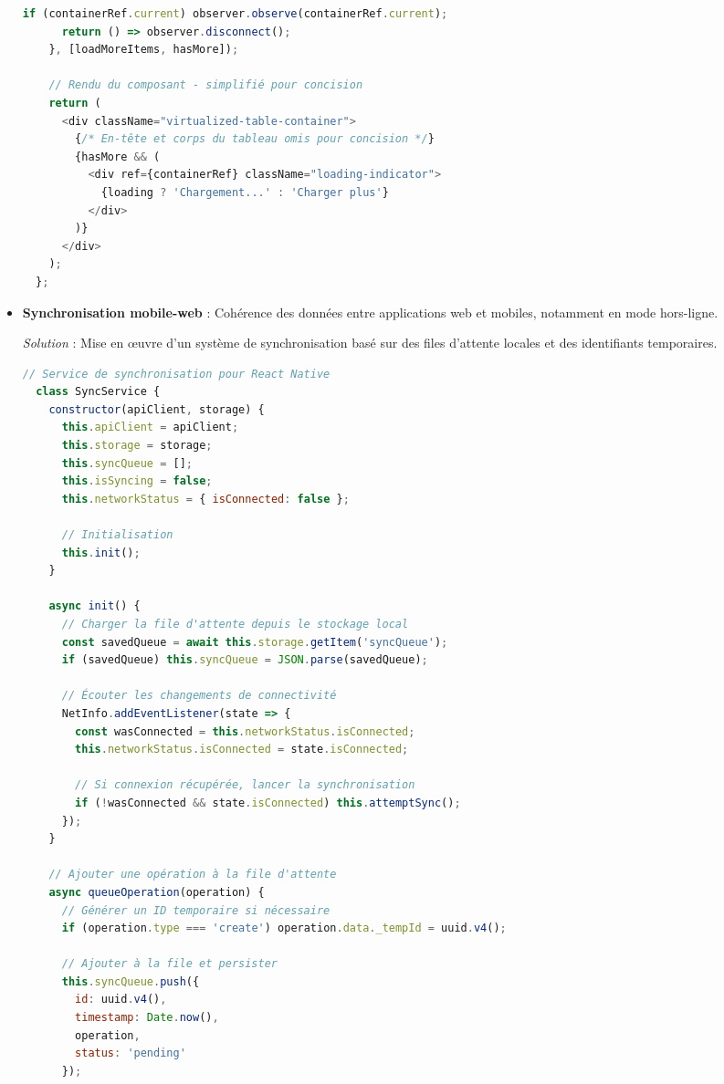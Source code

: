 \begin{itemize}
\begin{lstlisting}[style=codestyle, language=JavaScript]
      if (containerRef.current) observer.observe(containerRef.current);
      return () => observer.disconnect();
    }, [loadMoreItems, hasMore]);
    
    // Rendu du composant - simplifié pour concision
    return (
      <div className="virtualized-table-container">
        {/* En-tête et corps du tableau omis pour concision */}
        {hasMore && (
          <div ref={containerRef} className="loading-indicator">
            {loading ? 'Chargement...' : 'Charger plus'}
          </div>
        )}
      </div>
    );
  };
  \end{lstlisting}
  
  \item \textbf{Synchronisation mobile-web} : Cohérence des données entre applications web et mobiles, notamment en mode hors-ligne.
  
  \textit{Solution} : Mise en œuvre d'un système de synchronisation basé sur des files d'attente locales et des identifiants temporaires.
  
  \begin{lstlisting}[style=codestyle, language=JavaScript]
  // Service de synchronisation pour React Native
  class SyncService {
    constructor(apiClient, storage) {
      this.apiClient = apiClient;
      this.storage = storage;
      this.syncQueue = [];
      this.isSyncing = false;
      this.networkStatus = { isConnected: false };
      
      // Initialisation
      this.init();
    }
    
    async init() {
      // Charger la file d'attente depuis le stockage local
      const savedQueue = await this.storage.getItem('syncQueue');
      if (savedQueue) this.syncQueue = JSON.parse(savedQueue);
      
      // Écouter les changements de connectivité
      NetInfo.addEventListener(state => {
        const wasConnected = this.networkStatus.isConnected;
        this.networkStatus.isConnected = state.isConnected;
        
        // Si connexion récupérée, lancer la synchronisation
        if (!wasConnected && state.isConnected) this.attemptSync();
      });
    }
    
    // Ajouter une opération à la file d'attente
    async queueOperation(operation) {
      // Générer un ID temporaire si nécessaire
      if (operation.type === 'create') operation.data._tempId = uuid.v4();
      
      // Ajouter à la file et persister
      this.syncQueue.push({
        id: uuid.v4(),
        timestamp: Date.now(),
        operation,
        status: 'pending'
      });
      

\end{lstlisting}
\end{itemize}
